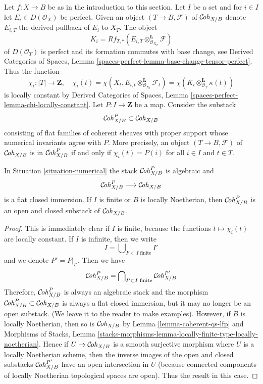 \begin{situation}
\label{situation-numerical}
Let $f : X \to B$ be as in the introduction to this section. Let $I$
be a set and for $i \in I$ let $E_i \in D(\mathcal{O}_X)$ be perfect.
Given an object $(T \to B, \mathcal{F})$ of $\mathcal{C}\!\mathit{oh}_{X/B}$
denote $E_{i, T}$ the derived pullback of $E_i$ to $X_T$.
The object
$$
K_i = Rf_{T, *}(E_{i, T} \otimes_{\mathcal{O}_{X_T}}^\mathbf{L} \mathcal{F})
$$
of $D(\mathcal{O}_T)$ is perfect and its formation commutes with base change,
see Derived Categories of Spaces, Lemma
\ref{spaces-perfect-lemma-base-change-tensor-perfect}.
Thus the function
$$
\chi_i : |T| \longrightarrow \mathbf{Z},\quad
\chi_i(t) =
\chi(X_t, E_{i, t} \otimes_{\mathcal{O}_{X_t}}^\mathbf{L} \mathcal{F}_t) =
\chi(K_i \otimes_{\mathcal{O}_T}^\mathbf{L} \kappa(t))
$$
is locally constant by Derived Categories of Spaces, Lemma
\ref{spaces-perfect-lemma-chi-locally-constant}.
Let $P : I \to \mathbf{Z}$ be a map. Consider the substack
$$
\mathcal{C}\!\mathit{oh}^P_{X/B} \subset \mathcal{C}\!\mathit{oh}_{X/B}
$$
consisting of flat families of coherent sheaves with proper support
whose numerical invariants agree with $P$. More precisely, an object
$(T \to B, \mathcal{F})$ of $\mathcal{C}\!\mathit{oh}_{X/B}$ is in
$\mathcal{C}\!\mathit{oh}^P_{X/B}$ if and only if $\chi_i(t) = P(i)$ for all $i \in I$
and $t \in T$.
\end{situation}

\begin{lemma}
\label{lemma-open-P}
In Situation \ref{situation-numerical} the stack
$\mathcal{C}\!\mathit{oh}^P_{X/B}$ is algebraic and
$$
\mathcal{C}\!\mathit{oh}^P_{X/B} \longrightarrow \mathcal{C}\!\mathit{oh}_{X/B}
$$
is a flat closed immersion. If $I$ is finite or $B$ is locally
Noetherian, then $\mathcal{C}\!\mathit{oh}^P_{X/B}$ is an open and closed substack of
$\mathcal{C}\!\mathit{oh}_{X/B}$.
\end{lemma}

\begin{proof}
This is immediately clear if $I$ is finite, because the functions
$t \mapsto \chi_i(t)$ are locally constant. If $I$ is infinite, then
we write
$$
I = \bigcup\nolimits_{I' \subset I\text{ finite}} I'
$$
and we denote $P' = P|_{I'}$. Then we have
$$
\mathcal{C}\!\mathit{oh}^P_{X/B} = \bigcap\nolimits_{I' \subset I\text{ finite}}
\mathcal{C}\!\mathit{oh}^{P'}_{X/B}
$$
Therefore, $\mathcal{C}\!\mathit{oh}^P_{X/B}$ is always an algebraic stack and the morphism
$\mathcal{C}\!\mathit{oh}^P_{X/B} \subset \mathcal{C}\!\mathit{oh}_{X/B}$ is always a flat closed immersion,
but it may no longer be an open substack. (We leave it to the reader to
make examples). However, if $B$ is locally Noetherian, then so
is $\mathcal{C}\!\mathit{oh}_{X/B}$ by Lemma \ref{lemma-coherent-qs-lfp} and
Morphisms of Stacks, Lemma
\ref{stacks-morphisms-lemma-locally-finite-type-locally-noetherian}.
Hence if $U \to \mathcal{C}\!\mathit{oh}_{X/B}$ is a smooth surjective morphism
where $U$ is a locally Noetherian scheme, then the inverse images of
the open and closed substacks $\mathcal{C}\!\mathit{oh}^{P'}_{X/B}$
have an open intersection in $U$ (because connected components of
locally Noetherian topological spaces are open).
Thus the result in this case.
\end{proof}

